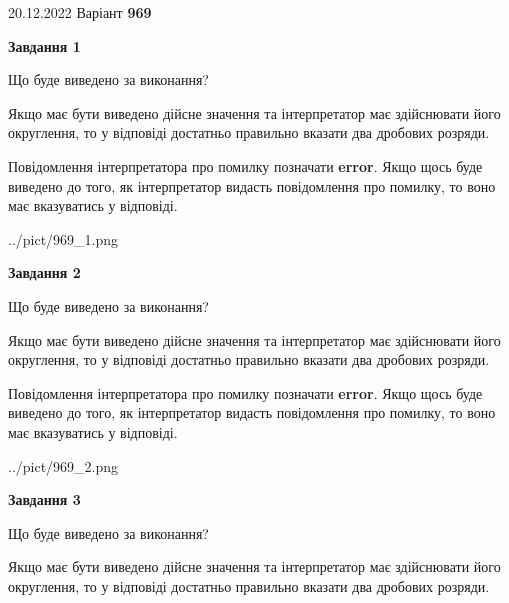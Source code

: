 \documentclass[12pt, ukrainian]{article}
\begin{document}
{20.12.2022 Варіант \No \textbf { 969 }\par}
{
\begin {Large}

{\begin {center}\textbf{Завдання 1}\end {center}}\par
Що буде виведено за виконання? \par

Якщо має бути виведено дійсне значення та інтерпретатор має здійснювати його округлення, 
то у відповіді достатньо правильно вказати два дробових розряди.

Повідомлення інтерпретатора про помилку позначати \textbf{error}.
Якщо щось буде виведено до того, як інтерпретатор видасть повідомлення про помилку, 
то воно має вказуватись у відповіді. \par

\begin{center}
	{../pict/969_1.png}
\end{center}
\newpage

{\begin {center}\textbf{Завдання 2}\end {center}}\par
Що буде виведено за виконання? \par

Якщо має бути виведено дійсне значення та інтерпретатор має здійснювати його округлення, 
то у відповіді достатньо правильно вказати два дробових розряди.

Повідомлення інтерпретатора про помилку позначати \textbf{error}.
Якщо щось буде виведено до того, як інтерпретатор видасть повідомлення про помилку, 
то воно має вказуватись у відповіді. \par

\begin{center}
	{../pict/969_2.png}
\end{center}
\newpage

{\begin {center}\textbf{Завдання 3}\end {center}}\par
Що буде виведено за виконання? \par

Якщо має бути виведено дійсне значення та інтерпретатор має здійснювати його округлення, 
то у відповіді достатньо правильно вказати два дробових розряди.


\end{Large}}
\end{document}
